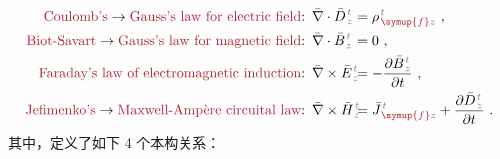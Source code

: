 \begin{subequations} \label{eq:maxwell}
\begin{align}
	\textcolor{Maroon}{\text{Coulomb's}} \to \textcolor{Maroon}{\text{Gauss's law for electric field}}\text{:}&\hspace{0.5em} \bar{\nabla} \cdot \bar{D}^{\;\!\textcolor{gray}{t}}_{\;\!\textcolor{gray}{z}} \hspace{-1.5em} &&= {\rho}^{\;\!\textcolor{gray}{t}}_{\;\!\textcolor{Maroon}{\symup{f}}\textcolor{gray}{z}}~, \label{eq:maxwell-d} \\ \textcolor{Maroon}{\text{Biot-Savart}} \to \textcolor{Maroon}{\text{Gauss's law for magnetic field}}\text{:}&\hspace{0.5em} \bar{\nabla} \cdot \bar{B}^{\;\!\textcolor{gray}{t}}_{\;\!\textcolor{gray}{z}} \hspace{-1.5em} &&= 0~, \label{eq:maxwell-b} \\ \textcolor{Maroon}{\text{Faraday's law of electromagnetic induction}}\text{:}&\hspace{0.5em} \bar{\nabla} \times \bar{E}^{\;\!\textcolor{gray}{t}}_{\;\!\textcolor{gray}{z}} \hspace{-1.5em} &&= - \frac{\partial \bar{B}^{\;\!\textcolor{gray}{t}}_{\;\!\textcolor{gray}{z}}}{\partial t}~, \label{eq:maxwell-e} \\ \textcolor{Maroon}{\text{Jefimenko's}} \to \textcolor{Maroon}{\text{Maxwell-Amp\`{e}re circuital law}}\text{:}&\hspace{0.5em} \bar{\nabla} \times \bar{H}^{\;\!\textcolor{gray}{t}}_{\;\!\textcolor{gray}{z}} \hspace{-1.5em} &&= \bar{J}^{\;\!\textcolor{gray}{t}}_{\;\!\textcolor{Maroon}{\symup{f}}\textcolor{gray}{z}} + \frac{\partial \bar{D}^{\;\!\textcolor{gray}{t}}_{\;\!\textcolor{gray}{z}}}{\partial t}~. \label{eq:maxwell-h}
\end{align}
\end{subequations}
其中，定义了如下 4 个本构关系：
